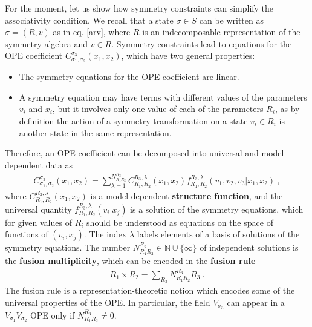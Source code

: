 \documentclass[12pt,a4paper,notitlepage]{report}
\numberwithin{equation}{section}
\theoremstyle{break}
\begin{document}
For the moment, let us show how symmetry constraints can simplify the associativity condition.
We recall that a state $\sigma\in S$ can be written as $\sigma=(R,v)$ as in eq. \eqref{arv}, where $R$ is an indecomposable representation of the symmetry algebra and $v\in R$.
Symmetry constraints lead to equations for the OPE coefficient 
$C_{\sigma_1,\sigma_2}^{\sigma_3}(x_1,x_2)$, which have two general properties:
\begin{itemize}
 \item The symmetry equations for the OPE coefficient are linear.
\item A symmetry equation may have terms with different values of the parameters $v_i$ and $x_i$, but it involves only one value of each of the parameters $R_i$, as by definition the action of a symmetry transformation on a state $v_i\in R_i$ is another state in the same representation. 
\end{itemize}
Therefore, an OPE coefficient can be decomposed into universal and model-dependent data as
\begin{align}
 C_{\sigma_1,\sigma_2}^{\sigma_3}(x_1,x_2) = \sum_{\lambda=1}^{N_{R_1R_2}^{R_3}} C_{R_1,R_2}^{R_3,\lambda}(x_1,x_2) f_{R_1,R_2}^{R_3,\lambda}(v_1,v_2,v_3|x_1,x_2)\ ,
\label{clcf}
\end{align}
where $C_{R_1,R_2}^{R_3,\lambda}(x_1,x_2)$ is a model-dependent \textbf{\boldmath structure function}, and 
the universal quantity $f_{R_1,R_2}^{R_3,\lambda}(v_i|x_j)$ is a solution of the symmetry equations, which for given values of $R_i$ should be understood as equations on the space of functions of $(v_i,x_j)$.
The index $\lambda$ labels elements of a basis of solutions of the symmetry equations.
The number $N_{R_1R_2}^{R_3}\in {\mathbb{N}} \cup \{\infty\}$ of independent solutions is the \textbf{\boldmath fusion multiplicity}, which can be encoded in the \textbf{\boldmath fusion rule}
\begin{align}
 R_1 \times R_2  = \sum_{R_3} N_{R_1R_2}^{R_3} R_3 \ . 
\label{rrnr}
\end{align}
The fusion rule is a representation-theoretic notion which encodes some of the universal properties of the OPE.
In particular, the field $V_{\sigma_3}$ can appear in a $V_{\sigma_1}V_{\sigma_2}$ OPE only if $N_{R_1R_2}^{R_3}\neq 0$.
\end{document}
